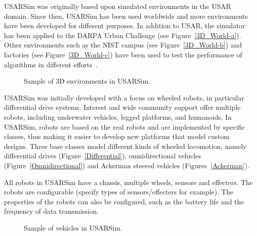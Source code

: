 USARSim was originally based upon simulated environments in the USAR domain.
Since then, USARSim has been used worldwide and more environments have been developed for different purposes. In addition to USAR, the simulator has been applied to the DARPA Urban Challenge (see Figure~\ref{3D_World-a}). Other environments such as the NIST campus (see Figure~\ref{3D_World-b}) and factories (see Figure~\ref{3D_World-c}) have been used to test the performance of algorithms in different efforts~\cite{WANG.HFES.2005,BALAGUER.IROS.2008,KOOTBALLY.ITEA.2010}.

\begin{figure}[t!]
\centering
{}\qquad
{}\qquad
{}%
\caption{Sample of 3D environments in USARSim.} \label{3D_World}
\end{figure}

USARSim was initially developed with a focus on wheeled robots, in
particular differential drive systems. Interest and wide community
support offer multiple robots, including underwater vehicles, legged
platforms, and humanoids. In USARSim, robots are based on the real
robots and are implemented by specific classes, thus making it
easier to develop new platforms that model custom designs. Three
base classes model different kinds of wheeled locomotion, namely
differential drives (Figure~\ref{Differential}), omnidirectional
vehicles (Figure~\ref{Omnidirectional}) and Ackerman steered
vehicles (Figures~\ref{Ackerman}).



All robots in USARSim have a chassis, multiple wheels, sensors and
effecters. The robots are configurable (specify types of
sensors/effecters for example). The properties of the robots can
also be configured, such as the battery life and the frequency of
data transmission.

\begin{figure}[t!]
\centering
{}\qquad
{}\qquad
{}
\caption{Sample of vehicles in USARSim.}
\end{figure}


